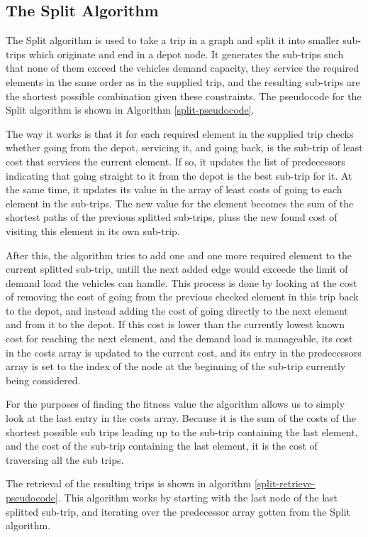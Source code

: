 
\subsection{The Split Algorithm} %
\label{sub:the_split_algorithm}

The Split algorithm is used to take a trip in a graph and split it into smaller sub-trips which originate and end in a depot node. It generates the sub-trips such that none of them exceed the vehicles demand capacity, they service the required elements in the same order as in the supplied trip, and the resulting sub-trips are the shortest possible combination given these constraints. The pseudocode for the Split algorithm is shown in Algorithm \ref{split-pseudocode}.

The way it works is that it for each required element in the supplied trip checks whether going from the depot, servicing it, and going back, is the sub-trip of least cost that services the current element. If so, it updates the list of predecessors indicating that going straight to it from the depot is the best sub-trip for it. At the same time, it updates its value in the array of least costs of going to each element in the sub-trips. The new value for the element becomes the sum of the shortest paths of the previous splitted sub-trips, pluss the new found cost of visiting this element in its own sub-trip.

After this, the algorithm tries to add one and one more required element to the current splitted sub-trip, untill the next added edge would exceede the limit of demand load the vehicles can handle. This process is done by looking at the cost of removing the cost of going from the previous checked element in this trip back to the depot, and instead adding the cost of going directly to the next element and from it to the depot. If this cost is lower than the currently lowest known cost for reaching the next element, and the demand load is manageable, its cost in the costs array is updated to the current cost, and its entry in the predecessors array is set to the index of the node at the beginning of the sub-trip currently being considered.

For the purposes of finding the fitness value the algorithm allows us to simply look at the last entry in the costs array. Because it is the sum of the costs of the shortest possible sub trips leading up to the sub-trip containing the last element, and the cost of the sub-trip containing the last element, it is the cost of traversing all the sub trips.

The retrieval of the resulting trips is shown in algorithm \ref{split-retrieve-pseudocode}. This algorithm works by starting with the last node of the last splitted sub-trip, and iterating over the predecessor array gotten from the Split algorithm.


\cleardoublepage